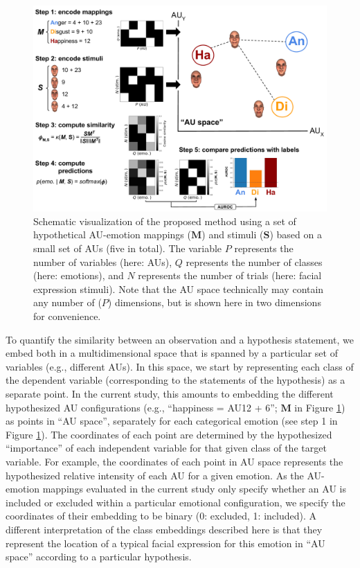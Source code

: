 \documentclass[12pt,american,a4paper,oneside,]{memoir} %
\begin{document}
\begin{figure}
\centering
\includegraphics{_bookdown_files/hypothesis-kernel-analysis-files/figures/figure_2.pdf}
\caption{\label{fig:fig-hka-2}Schematic visualization of the proposed method using a set of hypothetical AU-emotion mappings (\(\mathbf{M}\)) and stimuli (\(\mathbf{S}\)) based on a small set of AUs (five in total). The variable \(P\) represents the number of variables (here: AUs), \(Q\) represents the number of classes (here: emotions), and \(N\) represents the number of trials (here: facial expression stimuli). Note that the AU space technically may contain any number of (\(P\)) dimensions, but is shown here in two dimensions for convenience.}
\end{figure}



To quantify the similarity between an observation and a hypothesis statement, we embed both in a multidimensional space that is spanned by a particular set of variables (e.g., different AUs). In this space, we start by representing each class of the dependent variable (corresponding to the statements of the hypothesis) as a separate point. In the current study, this amounts to embedding the different hypothesized AU configurations (e.g., ``happiness = AU12 + 6''; \(\mathbf{M}\) in Figure \ref{fig:fig-hka-2}) as points in ``AU space'', separately for each categorical emotion (see step 1 in Figure \ref{fig:fig-hka-2}). The coordinates of each point are determined by the hypothesized ``importance'' of each independent variable for that given class of the target variable. For example, the coordinates of each point in AU space represents the hypothesized relative intensity of each AU for a given emotion. As the AU-emotion mappings evaluated in the current study only specify whether an AU is included or excluded within a particular emotional configuration, we specify the coordinates of their embedding to be binary (0: excluded, 1: included). A different interpretation of the class embeddings described here is that they represent the location of a typical facial expression for this emotion in ``AU space'' according to a particular hypothesis.
\end{document}

